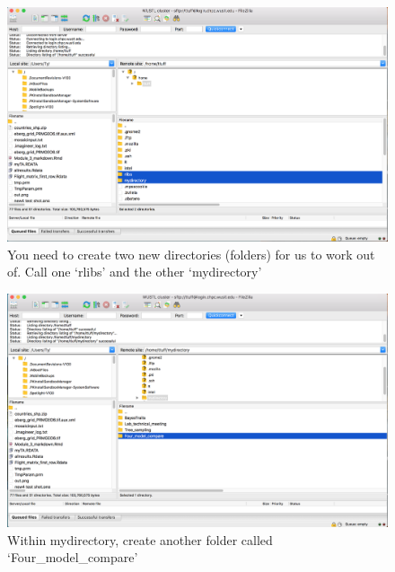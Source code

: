 \documentclass[]{book}
\theoremstyle{definition}
\theoremstyle{definition}
\theoremstyle{remark}
\begin{document}
\begin{figure}
\centering
\includegraphics{Create two files within your home file.png}
\caption{You need to create two new directories (folders) for us to work
out of. Call one `rlibs' and the other `mydirectory'}
\end{figure}

\begin{figure}
\centering
\includegraphics{Create Four_models_compare folder.png}
\caption{Within mydirectory, create another folder called
`Four\_model\_compare'}
\end{figure}
\end{document}
